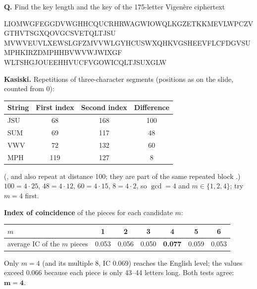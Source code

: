 \begin{worked}
\textbf{Q.} Find the key length and the key of the 175-letter Vigen\`ere ciphertext
\begin{center}\small\ttfamily
LIOMWGFEGGDVWGHHCQUCRHRWAGWIOWQLKGZETKKMEVLWPCZVGTHVTSGXQOVGCSVETQLTJSU\\
MVWVEUVLXEWSLGFZMVVWLGYHCUSWXQHKVGSHEEVFLCFDGVSUMPHKIRZDMPHHBVWVWJWIXGF\\
WLTSHGJOUEEHHVUCFVGOWICQLTJSUXGLW
\end{center}
\textbf{Kasiski.} Repetitions of three-character segments (positions as on the slide, counted from 0):
\begin{center}\small
\begin{tabular}{@{}lccc@{}}
\toprule
String & First index & Second index & Difference\\
\midrule
JSU & 68 & 168 & 100\\
SUM & 69 & 117 & 48\\
VWV & 72 & 132 & 60\\
MPH & 119 & 127 & 8\\
\bottomrule
\end{tabular}
\end{center}
(,  and  also repeat at distance 100; they are part of the same repeated block .) $100 = 4 \cdot 25$, $48 = 4 \cdot 12$, $60 = 4 \cdot 15$, $8 = 4 \cdot 2$, so $\gcd = 4$ and $m \in \{1, 2, 4\}$; try $m = 4$ first.

\textbf{Index of coincidence} of the pieces for each candidate $m$:
\begin{center}\small
\begin{tabular}{@{}lcccccc@{}}
\toprule
$m$ & 1 & 2 & 3 & 4 & 5 & 6\\
\midrule
average IC of the $m$ pieces & 0.053 & 0.056 & 0.050 & \textbf{0.077} & 0.059 & 0.053\\
\bottomrule
\end{tabular}
\end{center}
Only $m = 4$ (and its multiple 8, IC 0.069) reaches the English level; the values exceed 0.066 because each piece is only 43--44 letters long. Both tests agree: $\mathbf{m = 4}$.


\end{worked}
